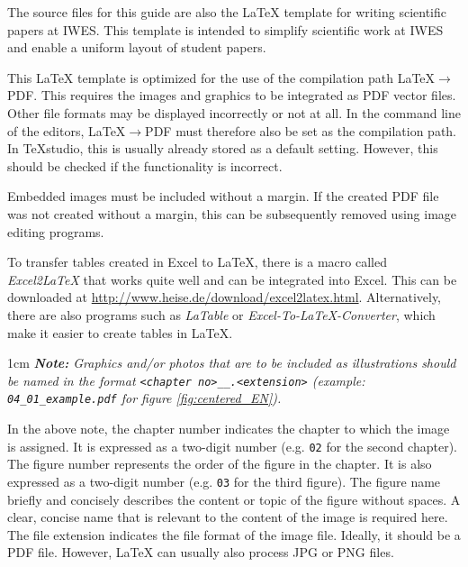 The source files for this guide are also the \LaTeX{} template for writing scientific papers at IWES. This template is intended to simplify scientific work at IWES and enable a uniform layout of student papers.

This \LaTeX{} template is optimized for the use of the compilation path \LaTeX{}$\rightarrow$PDF. This requires the images and graphics to be integrated as PDF vector files. Other file formats may be displayed incorrectly or not at all. In the command line of the editors, \LaTeX{}$\rightarrow$PDF must therefore also be set as the compilation path. In TeXstudio, this is usually already stored as a default setting. However, this should be checked if the functionality is incorrect.

Embedded images must be included without a margin. If the created PDF file was not created without a margin, this can be subsequently removed using image editing programs.

To transfer tables created in Excel to \LaTeX{}, there is a macro called \textit{Excel2LaTeX} that works quite well and can be integrated into Excel. This can be downloaded at \url{http://www.heise.de/download/excel2latex.html}. Alternatively, there are also programs such as \textit{LaTable} or \textit{Excel-To-LaTeX-Converter}, which make it easier to create tables in \LaTeX{}.


\begin{addmargin}[1cm]{1cm}
	\textit{\textbf{Note:} Graphics and/or photos that are to be included as illustrations should be named in the format \texttt{<chapter no>\_<illustration no>\_<illustration name>.<extension>} (example: \texttt{04\_01\_example.pdf} for figure \ref{fig:centered_EN}).}
\end{addmargin}


In the above note, the chapter number indicates the chapter to which the image is assigned. It is expressed as a two-digit number (e.g. \texttt{02} for the second chapter). The figure number represents the order of the figure in the chapter. It is also expressed as a two-digit number (e.g. \texttt{03} for the third figure). The figure name briefly and concisely describes the content or topic of the figure without spaces. A clear, concise name that is relevant to the content of the image is required here. The file extension indicates the file format of the image file. Ideally, it should be a PDF file. However, \LaTeX{} can usually also process JPG or PNG files.

